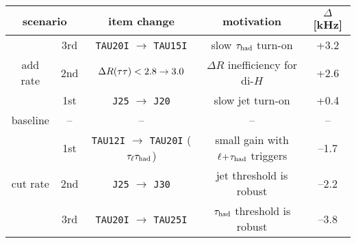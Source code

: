 \begin{tabular}{cc|c|c|c}
  \multicolumn{2}{c|}{scenario} & item change                                                 & motivation                         & $\Delta$ [kHz] \\
  \hline
           & 3rd & \texttt{TAU20I} $\rightarrow$ \texttt{TAU15I}               & slow $\tau_\text{had}$ turn-on               &  +3.2 \\
  add rate & 2nd & \texttt{$\Delta R(\tau\tau) < 2.8 \rightarrow 3.0$}          & $\Delta R$ inefficiency for di-$H$ &  +2.6 \\
           & 1st & \texttt{J25} $\rightarrow$ \texttt{J20}                     & slow jet turn-on                   &  +0.4 \\
  baseline & --  & --                                                          & --                                 & --    \\
           & 1st & \texttt{TAU12I} $\rightarrow$ \texttt{TAU20I} ($\tau_\ell\tau_\text{had}$) & small gain with $\ell\!+\!\tau_\text{had}$ triggers    & --1.7 \\
  cut rate & 2nd & \texttt{J25} $\rightarrow$ \texttt{J30}                     & jet threshold is robust            & --2.2 \\
           & 3rd & \texttt{TAU20I} $\rightarrow$ \texttt{TAU25I}               & $\tau_\text{had}$ threshold is robust        & --3.8 \\
\end{tabular}
